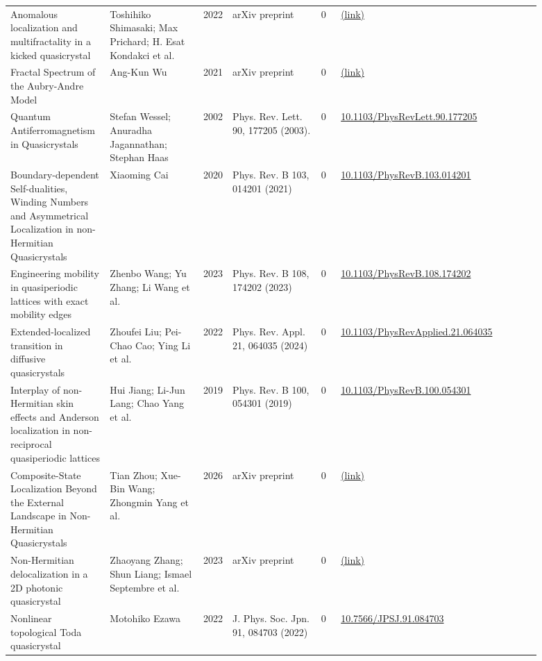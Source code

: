 \documentclass[10pt,a4paper]{article}
\begin{document}
{\begin{longtable}{p{0.192\linewidth}p{0.192\linewidth}p{0.043\linewidth}p{0.192\linewidth}p{0.043\linewidth}p{0.132\linewidth}p{0.096\linewidth}}
Anomalous localization and multifractality in a kicked quasicrystal & Toshihiko Shimasaki; Max Prichard; H. Esat Kondakci et al. & 2022 & arXiv preprint & 0 & \href{http://arxiv.org/abs/2203.09442v2}{(link)} &  \\
Fractal Spectrum of the Aubry-Andre Model & Ang-Kun Wu & 2021 & arXiv preprint & 0 & \href{http://arxiv.org/abs/2109.07062v2}{(link)} &  \\
Quantum Antiferromagnetism in Quasicrystals & Stefan Wessel; Anuradha Jagannathan; Stephan Haas & 2002 & Phys. Rev. Lett. 90, 177205 (2003). & 0 & \href{https://doi.org/10.1103/PhysRevLett.90.177205}{10.1103/PhysRevLett.90.177205} &  \\
Boundary-dependent Self-dualities, Winding Numbers and Asymmetrical Localization in non-Hermitian Quasicrystals & Xiaoming Cai & 2020 & Phys. Rev. B 103, 014201 (2021) & 0 & \href{https://doi.org/10.1103/PhysRevB.103.014201}{10.1103/PhysRevB.103.014201} &  \\
Engineering mobility in quasiperiodic lattices with exact mobility edges & Zhenbo Wang; Yu Zhang; Li Wang et al. & 2023 & Phys. Rev. B 108, 174202 (2023) & 0 & \href{https://doi.org/10.1103/PhysRevB.108.174202}{10.1103/PhysRevB.108.174202} &  \\
Extended-localized transition in diffusive quasicrystals & Zhoufei Liu; Pei-Chao Cao; Ying Li et al. & 2022 & Phys. Rev. Appl. 21, 064035 (2024) & 0 & \href{https://doi.org/10.1103/PhysRevApplied.21.064035}{10.1103/PhysRevApplied.21.064035} &  \\
Interplay of non-Hermitian skin effects and Anderson localization in non-reciprocal quasiperiodic lattices & Hui Jiang; Li-Jun Lang; Chao Yang et al. & 2019 & Phys. Rev. B 100, 054301 (2019) & 0 & \href{https://doi.org/10.1103/PhysRevB.100.054301}{10.1103/PhysRevB.100.054301} &  \\
Composite-State Localization Beyond the External Landscape in Non-Hermitian Quasicrystals & Tian Zhou; Xue-Bin Wang; Zhongmin Yang et al. & 2026 & arXiv preprint & 0 & \href{http://arxiv.org/abs/2608.08105v1}{(link)} &  \\
Non-Hermitian delocalization in a 2D photonic quasicrystal & Zhaoyang Zhang; Shun Liang; Ismael Septembre et al. & 2023 & arXiv preprint & 0 & \href{http://arxiv.org/abs/2312.09322v1}{(link)} &  \\
Nonlinear topological Toda quasicrystal & Motohiko Ezawa & 2022 & J. Phys. Soc. Jpn. 91, 084703 (2022) & 0 & \href{https://doi.org/10.7566/JPSJ.91.084703}{10.7566/JPSJ.91.084703} &  \\

\end{longtable}}
\end{document}
